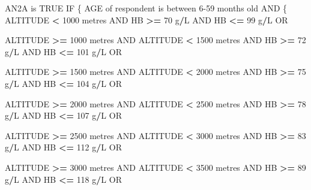 \documentclass[12pt,a4paper]{article}
\newenvironment{Shaded}{\begin{snugshade}}{\end{snugshade}}
\newcommand{\DecValTok}[1]{\textcolor[rgb]{0.00,0.00,0.81}{#1}}
\newcommand{\NormalTok}[1]{#1}
\newcommand{\OperatorTok}[1]{\textcolor[rgb]{0.81,0.36,0.00}{\textbf{#1}}}
\newcommand{\OtherTok}[1]{\textcolor[rgb]{0.56,0.35,0.01}{#1}}
\newcommand{\StringTok}[1]{\textcolor[rgb]{0.31,0.60,0.02}{#1}}
\begin{document}
\begin{Shaded}
\begin{Highlighting}[]
\NormalTok{AN2A is }\OtherTok{TRUE}\NormalTok{ IF}
\NormalTok{  \{}
\NormalTok{    AGE of respondent is between }\DecValTok{6-59}\NormalTok{ months old AND}
\NormalTok{      \{}
\NormalTok{        ALTITUDE }\OperatorTok{<}\StringTok{ }\DecValTok{1000}\NormalTok{ metres AND HB }\OperatorTok{>=}\StringTok{ }\DecValTok{70}\NormalTok{ g}\OperatorTok{/}\NormalTok{L AND HB }\OperatorTok{<=}\StringTok{ }\DecValTok{99}\NormalTok{ g}\OperatorTok{/}\NormalTok{L OR}
     
\NormalTok{        ALTITUDE }\OperatorTok{>=}\StringTok{ }\DecValTok{1000}\NormalTok{ metres AND ALTITUDE }\OperatorTok{<}\StringTok{ }\DecValTok{1500}\NormalTok{ metres AND }
\NormalTok{          HB }\OperatorTok{>=}\StringTok{ }\DecValTok{72}\NormalTok{ g}\OperatorTok{/}\NormalTok{L AND HB }\OperatorTok{<=}\StringTok{ }\DecValTok{101}\NormalTok{ g}\OperatorTok{/}\NormalTok{L OR}
     
\NormalTok{        ALTITUDE }\OperatorTok{>=}\StringTok{ }\DecValTok{1500}\NormalTok{ metres AND ALTITUDE }\OperatorTok{<}\StringTok{ }\DecValTok{2000}\NormalTok{ metres AND }
\NormalTok{          HB }\OperatorTok{>=}\StringTok{ }\DecValTok{75}\NormalTok{ g}\OperatorTok{/}\NormalTok{L AND HB }\OperatorTok{<=}\StringTok{ }\DecValTok{104}\NormalTok{ g}\OperatorTok{/}\NormalTok{L OR}

\NormalTok{        ALTITUDE }\OperatorTok{>=}\StringTok{ }\DecValTok{2000}\NormalTok{ metres AND ALTITUDE }\OperatorTok{<}\StringTok{ }\DecValTok{2500}\NormalTok{ metres AND }
\NormalTok{          HB }\OperatorTok{>=}\StringTok{ }\DecValTok{78}\NormalTok{ g}\OperatorTok{/}\NormalTok{L AND HB }\OperatorTok{<=}\StringTok{ }\DecValTok{107}\NormalTok{ g}\OperatorTok{/}\NormalTok{L OR}

\NormalTok{        ALTITUDE }\OperatorTok{>=}\StringTok{ }\DecValTok{2500}\NormalTok{ metres AND ALTITUDE }\OperatorTok{<}\StringTok{ }\DecValTok{3000}\NormalTok{ metres AND }
\NormalTok{          HB }\OperatorTok{>=}\StringTok{ }\DecValTok{83}\NormalTok{ g}\OperatorTok{/}\NormalTok{L AND HB }\OperatorTok{<=}\StringTok{ }\DecValTok{112}\NormalTok{ g}\OperatorTok{/}\NormalTok{L OR}

\NormalTok{        ALTITUDE }\OperatorTok{>=}\StringTok{ }\DecValTok{3000}\NormalTok{ metres AND ALTITUDE }\OperatorTok{<}\StringTok{ }\DecValTok{3500}\NormalTok{ metres AND }
\NormalTok{          HB }\OperatorTok{>=}\StringTok{ }\DecValTok{89}\NormalTok{ g}\OperatorTok{/}\NormalTok{L AND HB }\OperatorTok{<=}\StringTok{ }\DecValTok{118}\NormalTok{ g}\OperatorTok{/}\NormalTok{L OR}


\end{Highlighting}
\end{Shaded}
\end{document}
